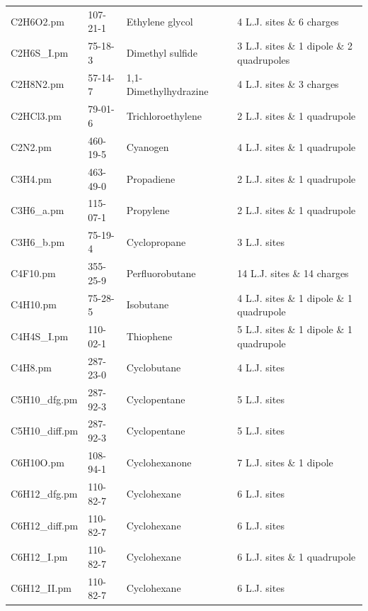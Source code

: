 \begin{landscape}
\begin{longtable}{lllll}
	C2H6O2.pm & 107-21-1 & Ethylene glycol & \parencite{Huang2012} & 4 L.J. sites \& 6 charges \\
	C2H6S\_I.pm & 75-18-3 & Dimethyl sulfide & \parencite{Eckl2008_C} & 3 L.J. sites \& 1 dipole \& 2 quadrupoles  \\
	C2H8N2.pm & 57-14-7 & 1,1-Dimethylhydrazine & \parencite{Elts2012} & 4 L.J. sites \& 3 charges \\
	C2HCl3.pm & 79-01-6 & Trichloroethylene & \parencite{Stoll2003} & 2 L.J. sites \& 1 quadrupole \\
	C2N2.pm & 460-19-5 & Cyanogen & \parencite{Miroshnichenko2013} & 4 L.J. sites \& 1 quadrupole \\
	C3H4.pm & 463-49-0 & Propadiene & \parencite{Vrabec2001} & 2 L.J. sites \& 1 quadrupole \\
C3H6\_a.pm & 115-07-1 & Propylene & \parencite{Vrabec2001} & 2 L.J. sites \& 1 quadrupole \\
	C3H6\_b.pm & 75-19-4 & Cyclopropane & \parencite{Munoz2015} & 3 L.J. sites \\
	C4F10.pm & 355-25-9 & Perfluorobutane & \parencite{Koester2012} & 14 L.J. sites \& 14 charges \\
	C4H10.pm & 75-28-5 & Isobutane & \parencite{Eckl2008_C} & 4 L.J. sites \& 1 dipole \& 1 quadrupole \\
	C4H4S\_I.pm & 110-02-1 & Thiophene & \parencite{Eckl2008_C} & 5 L.J. sites \& 1 dipole \& 1 quadrupole \\
	C4H8.pm & 287-23-0 & Cyclobutane & \parencite{Munoz2015} & 4 L.J. sites \\
	C5H10\_dfg.pm & 287-92-3 & Cyclopentane & \parencite{Munoz2015} & 5 L.J. sites  \\
	C5H10\_diff.pm & 287-92-3 & Cyclopentane & \parencite{Munoz2015} & 5 L.J. sites \\
	C6H10O.pm & 108-94-1 & Cyclohexanone & \parencite{Merker2012} & 7 L.J. sites \& 1 dipole \\
	C6H12\_dfg.pm & 110-82-7 & Cyclohexane & \parencite{Munoz2015} & 6 L.J. sites \\
	C6H12\_diff.pm & 110-82-7 & Cyclohexane & \parencite{Munoz2015} & 6 L.J. sites \\
	C6H12\_I.pm & 110-82-7 & Cyclohexane & \parencite{Eckl2008_C} & 6 L.J. sites \& 1 quadrupole \\
	C6H12\_II.pm & 110-82-7 & Cyclohexane & \parencite{Merker2012} & 6 L.J. sites \\

\end{longtable}
\end{landscape}
